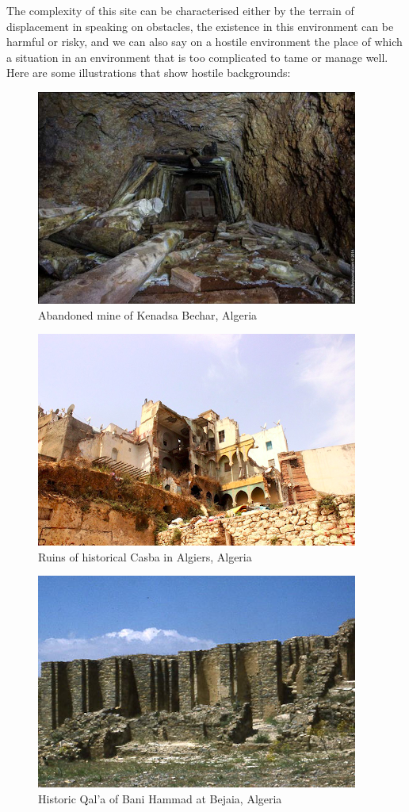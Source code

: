 \documentclass[Afour,sageh,times]{sagej}
\begin{document}
The complexity of this site can be characterised either by the terrain of displacement in speaking on obstacles, the existence in this environment can be harmful or risky, and we can also say on a hostile environment the place of which a situation in an environment that is too complicated to tame or manage well.
Here are some illustrations that show hostile backgrounds:
\begin{figure}
    \centering
    \includegraphics[scale=15]{KenadsaMine.png}
    \caption{Abandoned mine of Kenadsa Bechar, Algeria}
    \label{fig:Kendsa}
\end{figure}
\begin{figure}
    \centering
    \includegraphics[scale=15]{Casba.png}
    \caption{Ruins of historical Casba in Algiers, Algeria}
    \label{fig:Casba}
\end{figure}
\begin{figure}
    \centering
    \includegraphics[scale=15]{Qal'abaniHammad.png}
    \caption{Historic Qal'a of Bani Hammad at Bejaia, Algeria}
    \label{fig:hammad}
\end{figure}
\end{document}
